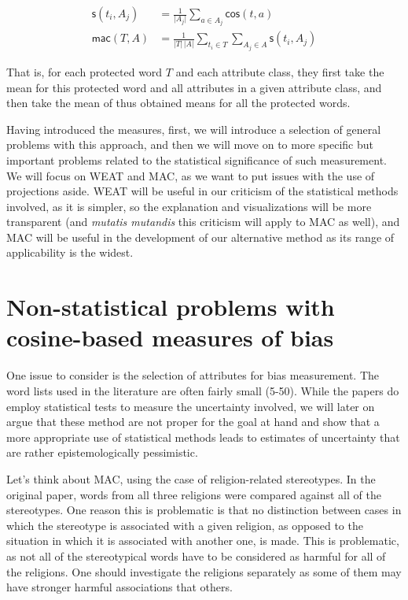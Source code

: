 \documentclass[
  10pt,
  dvipsnames,enabledeprecatedfontcommands, twocolumn]{scrartcl}
\begin{document}
\vspace{-2mm }
\footnotesize

\begin{align}
\mathsf{s}(t_i, A_j) & = \frac{1}{\vert A_j\vert}\sum_{a\in A_j}\mathsf{cos}(t,a) \\
\mathsf{mac}(T,A) & = \frac{1}{\vert T \vert \,\vert A\vert}\sum_{t_i \in T }\sum_{A_j \in A} \mathsf{s}(t_i,A_j)
\end{align}

\normalsize

\noindent That is, for each protected word \(T\) and each attribute
class, they first take the mean for this protected word and all
attributes in a given attribute class, and then take the mean of thus
obtained means for all the protected words.

Having introduced the measures, first, we will introduce a selection of
general problems with this approach, and then we will move on to more
specific but important problems related to the statistical significance
of such measurement. We will focus on WEAT and MAC, as we want to put
issues with the use of projections aside. WEAT will be useful in our
criticism of the statistical methods involved, as it is simpler, so the
explanation and visualizations will be more transparent (and
\emph{mutatis mutandis} this criticism will apply to MAC as well), and
MAC will be useful in the development of our alternative method as its
range of applicability is the widest.

\hypertarget{non-statistical-problems-with-cosine-based-measures-of-bias}{%
\section{Non-statistical problems with cosine-based measures of
bias}\label{non-statistical-problems-with-cosine-based-measures-of-bias}}

One issue to consider is the selection of attributes for bias
measurement. The word lists used in the literature are often fairly
small (5-50). While the papers do employ statistical
tests to measure the uncertainty involved, we will later on argue that
these method are not proper for the goal at hand and show that a more
appropriate use of statistical methods leads to estimates of uncertainty
that are rather epistemologically pessimistic.

Let's think about MAC, using the case of religion-related
stereotypes. In the
original paper, words from all three religions were compared against all
of the stereotypes. One reason this is problematic is that no
distinction between cases in which the stereotype is associated with a
given religion, as opposed to the situation in which it is associated
with another one, is made. This is problematic, as not all of the
stereotypical words have to be considered as harmful for all of the
religions. One should investigate the religions separately as some of
them may have stronger harmful associations that others.
\end{document}
